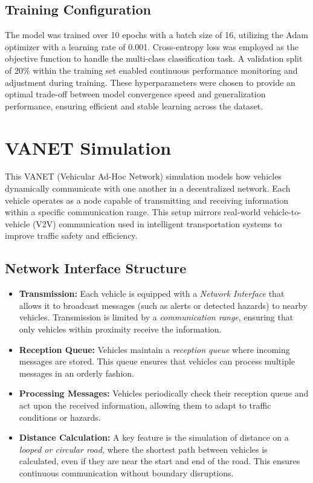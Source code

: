 \subsection{Training Configuration}

The model was trained over 10 epochs with a batch size of 16, utilizing the Adam optimizer with a learning rate of 0.001. Cross-entropy loss was employed as the objective function to handle the multi-class classification task. A validation split of 20\% within the training set enabled continuous performance monitoring and adjustment during training. These hyperparameters were chosen to provide an optimal trade-off between model convergence speed and generalization performance, ensuring efficient and stable learning across the dataset.

\section{VANET Simulation}

This VANET (Vehicular Ad-Hoc Network) simulation models how vehicles dynamically communicate with one another in a decentralized network. Each vehicle operates as a node capable of transmitting and receiving information within a specific communication range. This setup mirrors real-world vehicle-to-vehicle (V2V) communication used in intelligent transportation systems to improve traffic safety and efficiency.

\subsection{Network Interface Structure}
\begin{itemize}
    \item \textbf{Transmission:} Each vehicle is equipped with a \textit{Network Interface} that allows it to broadcast messages (such as alerts or detected hazards) to nearby vehicles. Transmission is limited by a \textit{communication range}, ensuring that only vehicles within proximity receive the information.
    \item \textbf{Reception Queue:} Vehicles maintain a \textit{reception queue} where incoming messages are stored. This queue ensures that vehicles can process multiple messages in an orderly fashion.
    \item \textbf{Processing Messages:} Vehicles periodically check their reception queue and act upon the received information, allowing them to adapt to traffic conditions or hazards.
    \item \textbf{Distance Calculation:} A key feature is the simulation of distance on a \textit{looped or circular road}, where the shortest path between vehicles is calculated, even if they are near the start and end of the road. This ensures continuous communication without boundary disruptions.
\end{itemize}

